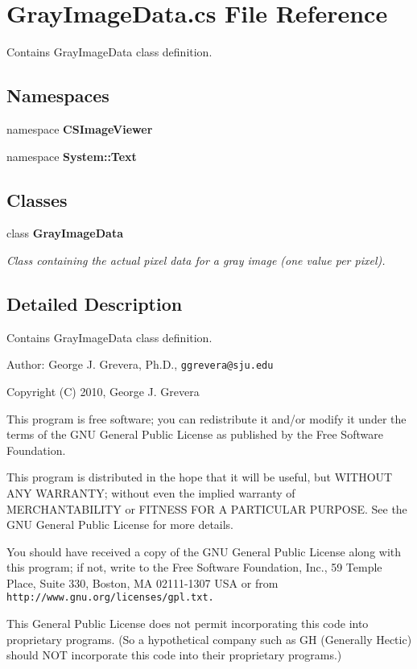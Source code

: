 \section{Gray\-Image\-Data.cs File Reference}
\label{_gray_image_data_8cs}
Contains Gray\-Image\-Data class definition. 

\subsection*{Namespaces}
\begin{CompactItemize}
\item 
namespace {\bf CSImage\-Viewer}
\item 
namespace {\bf System::Text}
\end{CompactItemize}
\subsection*{Classes}
\begin{CompactItemize}
\item 
class {\bf Gray\-Image\-Data}
\begin{CompactList}\small\item\em Class containing the actual pixel data for a gray image (one value per pixel). \item\end{CompactList}\end{CompactItemize}


\subsection{Detailed Description}
Contains Gray\-Image\-Data class definition. 

\begin{Desc}
\item[Author:]George J. Grevera, Ph.D., {\tt ggrevera@sju.edu}\end{Desc}
Copyright (C) 2010, George J. Grevera

This program is free software; you can redistribute it and/or modify it under the terms of the GNU General Public License as published by the Free Software Foundation.

This program is distributed in the hope that it will be useful, but WITHOUT ANY WARRANTY; without even the implied warranty of MERCHANTABILITY or FITNESS FOR A PARTICULAR PURPOSE. See the GNU General Public License for more details.

You should have received a copy of the GNU General Public License along with this program; if not, write to the Free Software Foundation, Inc., 59 Temple Place, Suite 330, Boston, MA 02111-1307 USA or from {\tt http://www.gnu.org/licenses/gpl.txt.}

This General Public License does not permit incorporating this code into proprietary programs. (So a hypothetical company such as GH (Generally Hectic) should NOT incorporate this code into their proprietary programs.) 